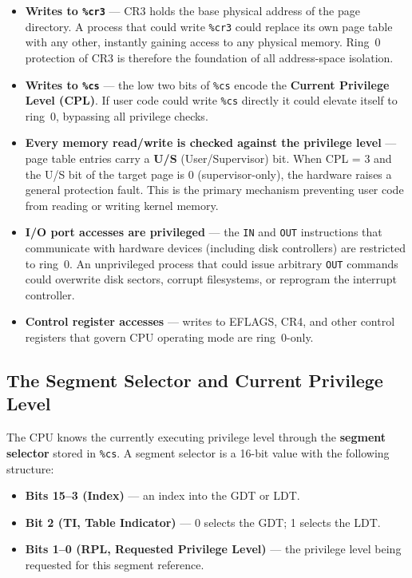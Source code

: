 \documentclass[11pt]{article}
\begin{document}
\begin{itemize}
    \item \textbf{Writes to \texttt{\%cr3}} --- CR3 holds the base physical address of the
          page directory. A process that could write \texttt{\%cr3} could replace its own
          page table with any other, instantly gaining access to any physical memory. Ring~0
          protection of CR3 is therefore the foundation of all address-space isolation.
    \item \textbf{Writes to \texttt{\%cs}} --- the low two bits of \texttt{\%cs} encode the
          \textbf{Current Privilege Level (CPL)}. If user code could write \texttt{\%cs}
          directly it could elevate itself to ring~0, bypassing all privilege checks.
    \item \textbf{Every memory read/write is checked against the privilege level} ---
          page table entries carry a \textbf{U/S} (User/Supervisor) bit. When CPL = 3 and
          the U/S bit of the target page is 0 (supervisor-only), the hardware raises a
          general protection fault. This is the primary mechanism preventing user code from
          reading or writing kernel memory.
    \item \textbf{I/O port accesses are privileged} --- the \texttt{IN} and \texttt{OUT}
          instructions that communicate with hardware devices (including disk controllers)
          are restricted to ring~0. An unprivileged process that could issue arbitrary
          \texttt{OUT} commands could overwrite disk sectors, corrupt filesystems, or
          reprogram the interrupt controller.
    \item \textbf{Control register accesses} --- writes to EFLAGS, CR4, and other control
          registers that govern CPU operating mode are ring~0-only.
\end{itemize}

\subsection{The Segment Selector and Current Privilege Level}

The CPU knows the currently executing privilege level through the \textbf{segment selector}
stored in \texttt{\%cs}. A segment selector is a 16-bit value with the following structure:

\begin{itemize}
    \item \textbf{Bits 15--3 (Index)} --- an index into the GDT or LDT.
    \item \textbf{Bit 2 (TI, Table Indicator)} --- 0 selects the GDT; 1 selects the LDT.
    \item \textbf{Bits 1--0 (RPL, Requested Privilege Level)} --- the privilege level
          being requested for this segment reference.
\end{itemize}
\end{document}
